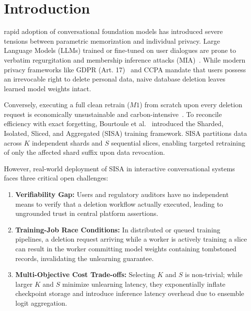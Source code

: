 \documentclass[10pt,journal,compsoc]{IEEEtran}
\begin{document}
\maketitle
\IEEEdisplaynontitleabstractindextext
\IEEEpeerreviewmaketitle

\section{Introduction}
 rapid adoption of conversational foundation models has introduced severe tensions between parametric memorization and individual privacy. Large Language Models (LLMs) trained or fine-tuned on user dialogues are prone to verbatim regurgitation and membership inference attacks (MIA)~\cite{carlini2021extracting,shokri2017membership}. While modern privacy frameworks like GDPR (Art. 17)~\cite{gdpr2016regulation} and CCPA mandate that users possess an irrevocable right to delete personal data, naive database deletion leaves learned model weights intact. 

Conversely, executing a full clean retrain ($M1$) from scratch upon every deletion request is economically unsustainable and carbon-intensive~\cite{ginart2019making}. To reconcile efficiency with exact forgetting, Bourtoule et al.~\cite{bourtoule2021machine} introduced the Sharded, Isolated, Sliced, and Aggregated (SISA) training framework. SISA partitions data across $K$ independent shards and $S$ sequential slices, enabling targeted retraining of only the affected shard suffix upon data revocation.

However, real-world deployment of SISA in interactive conversational systems faces three critical open challenges:
\begin{enumerate}
    \item \textbf{Verifiability Gap:} Users and regulatory auditors have no independent means to verify that a deletion workflow actually executed, leading to ungrounded trust in central platform assertions.
    \item \textbf{Training-Job Race Conditions:} In distributed or queued training pipelines, a deletion request arriving while a worker is actively training a slice can result in the worker committing model weights containing tombstoned records, invalidating the unlearning guarantee.
    \item \textbf{Multi-Objective Cost Trade-offs:} Selecting $K$ and $S$ is non-trivial; while larger $K$ and $S$ minimize unlearning latency, they exponentially inflate checkpoint storage and introduce inference latency overhead due to ensemble logit aggregation.
\end{enumerate}
\end{document}
